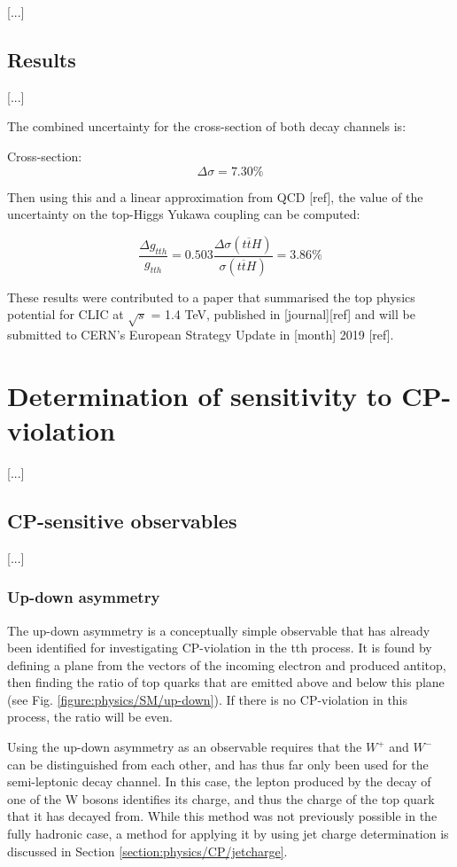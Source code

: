 [...]

\subsection{Results}
[...] 

The combined uncertainty for the cross-section of both decay channels is:

Cross-section: $$\Delta\sigma = 7.30\% $$

Then using this and a linear approximation from QCD [ref], the value of the uncertainty on the top-Higgs Yukawa coupling can be computed:

$$\frac{\Delta g_{tth}}{g_{tth}} = 0.503 \frac{\Delta\sigma(t\overline{t}H)}{\sigma(t\overline{t}H)} = 3.86\% $$

These results were contributed to a paper that summarised the top physics potential for CLIC at $\sqrt{s}$ = 1.4 TeV, published in [journal][ref] and will be submitted to CERN's European Strategy Update in [month] 2019 [ref].

\section{Determination of sensitivity to CP-violation}
[...]

\subsection{CP-sensitive observables}
[...]

\subsubsection{Up-down asymmetry}
The up-down asymmetry is a conceptually simple observable that has already been identified for investigating CP-violation in the tth process. It is found by defining a plane from the vectors of the incoming electron and produced antitop, then finding the ratio of top quarks that are emitted above and below this plane (see Fig. \ref{figure:physics/SM/up-down}). If there is no CP-violation in this process, the ratio will be even.

Using the up-down asymmetry as an observable requires that the $W^+$ and $W^-$ can be distinguished from each other, and has thus far only been used for the semi-leptonic decay channel. In this case, the lepton produced by the decay of one of the W bosons identifies its charge, and thus the charge of the top quark that it has decayed from. While this method was not previously possible in the fully hadronic case, a method for applying it by using jet charge determination is discussed in Section \ref{section:physics/CP/jetcharge}.

